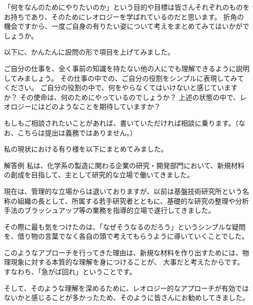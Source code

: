 \documentclass[uplatex,dvipdfmx,a4paper,11pt]{jsarticle}
\begin{document}
\begin{qparts}
    \qpart 「何をなんのためにやりたいのか」という目的や目標は皆さんそれぞれのものをお持ちであり、そのためにレオロジーを学ばれているのだと思います。
    折角の機会ですから、一度ご自身の有りたい姿について考えをまとめてみてはいかがでしょうか。

    以下に、かんたんに設問の形で項目を上げてみました。
    \vspace{-2mm}
    \begin{qlist}
        \qitem ご自分の仕事を、全く事前の知識を持たない他の人にでも理解できるように説明してみましょう。
        \qitem その仕事の中での、ご自分の役割をシンプルに表現してみてください。
        \qitem ご自分の役割の中で、何をやらなくてはいけないと感じていますか？
        \qitem その使命は、何のためにやっているのでしょうか？
        \qitem 上述の状態の中で、レオロジーにはどのようなことを期待していますか？
    \end{qlist}
    \vspace{-2mm}
    \qpart もしもご相談されたいことがあれば、書いていただければ相談に乗ります。（なお、こちらは提出は義務ではありません。）
\end{qparts}

私の現状における有り様を以下にまとめてみました。
\begin{itembox}[l]{解答例}
私は、化学系の製造に関わる企業の研究・開発部門において、新規材料の創成を目指して、主として研究的な立場で働いてきました。

現在は、管理的な立場からは退いておりますが、以前は基盤技術研究所という名称の組織の長として、所属する若手研究者とともに、基礎的な研究の整理や分析手法のブラッシュアップ等の業務を指導的立場で遂行してきました。

その際に最も気をつけたのは、「なぜそうなるのだろう」というシンプルな疑問を、借り物の言葉でなく各自の頭で考えてもらうように導いていくことでした。

このようなアプローチを行ってきた理由は、新規な材料を作り出すためには、物理現象に対する本質的な理解を身につけることが、
大事だと考えたからです。
すなわち、「急がば回れ」ということです。

そして、そのような理解を深めるために、レオロジー的なアプローチが有効ではないかと感じることが多かったため、そのように皆さんにお勧めしてきました。
\end{itembox}
\end{document}
